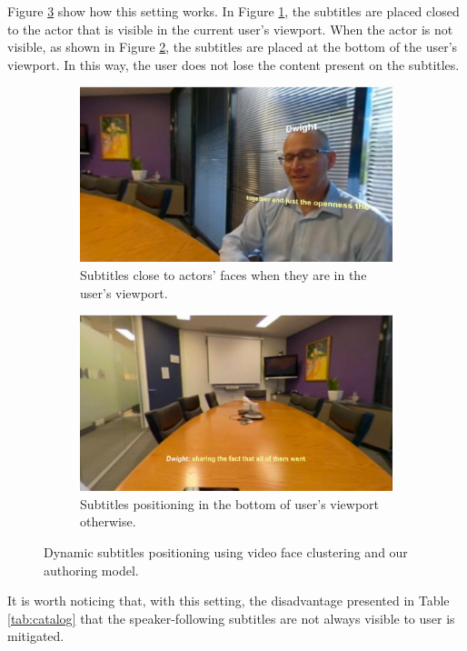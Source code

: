 Figure \ref{fig:dynamic_subtitles} show how this setting works. In Figure \ref{subfig:subtitles_actor}, the subtitles are placed closed to the actor that is visible in the current user's viewport. When the actor is not visible, as shown in Figure \ref{subfig:subtitles_bottom}, the subtitles are placed at the bottom of the user's viewport. In this way, the user does not lose the content present on the subtitles.

\begin{figure}[!ht]
\centering
    \begin{subfigure}{0.47\linewidth}
        \centering
        \includegraphics[width=1\textwidth]{img/video360/subtitles_actor.png}
        \caption{Subtitles close to actors' faces when they are in the user's viewport.}
        \label{subfig:subtitles_actor}
    \end{subfigure}\hfill
    \begin{subfigure}{0.47\linewidth}
        \centering
        \includegraphics[width=1\textwidth]{img/video360/subtitles_bottom.png}
        \caption{Subtitles positioning in the bottom of user's viewport otherwise.}
        \label{subfig:subtitles_bottom}
    \end{subfigure}

\caption{Dynamic subtitles positioning using video face clustering and our authoring model.}
\label{fig:dynamic_subtitles}
\end{figure}

It is worth noticing that, with this setting, the disadvantage presented in Table \ref{tab:catalog} that the speaker-following subtitles are not always visible to user is mitigated.